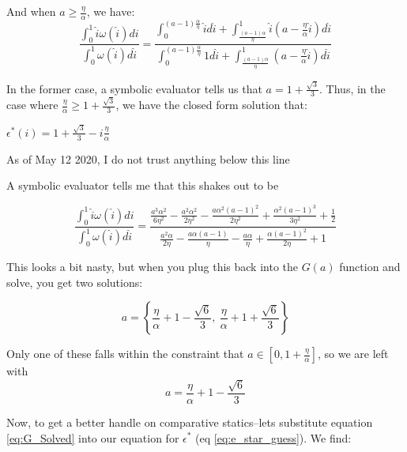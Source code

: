 \documentclass[WP]{AEA}
\begin{document}
And when $a \geq \frac{\eta}{\alpha}$, we have:
\begin{equation}\label{eq:E_solved_big_a}
\frac{\int_0^1 \hat{i} \omega(\hat{i}) di}{\int_0^1  \omega(\hat{i}) d\hat{i}} 
=  \frac{\int_0^{(a-1)\frac{\alpha}{\eta}}  \hat{i} d\hat{i} + 
	\int_{\frac{(a-1)\alpha}{\eta}}^1  \hat{i} (a - \frac{\eta}{\alpha}\hat{i}) d\hat{i} }{\int_0^{(a-1)\frac{\alpha}{\eta}} 1 d\hat{i} + 
	\int_{\frac{(a-1)\alpha}{\eta}}^1  (a - \frac{\eta}{\alpha}\hat{i}) d\hat{i} } 
\end{equation}


In the former case, a symbolic evaluator tells us that $a = 1+\frac{\sqrt{3}}{3}$.  Thus, in the case where $ \frac{\eta}{\alpha} \geq 1+\frac{\sqrt{3}}{3}$, we have the closed form solution that:

$\epsilon^*(i) = 1+\frac{\sqrt{3}}{3} - i \frac{\eta}{\alpha}$


As of May 12 2020, I do not trust anything below this line

A symbolic evaluator tells me that this shakes out to be

\begin{equation}
 \frac{\int_0^1 \hat{i} \omega(\hat{i}) di}{\int_0^1  \omega(\hat{i}) d\hat{i}} = \frac{\frac{a^{3} \alpha^{2}}{6 \eta^{2}} - \frac{a^{2} \alpha^{2}}{2 \eta^{2}} - \frac{a \alpha^{2} \left(a - 1\right)^{2}}{2 \eta^{2}} + \frac{\alpha^{2} \left(a - 1\right)^{3}}{3 \eta^{2}} + \frac{1}{2}}{\frac{a^{2} \alpha}{2 \eta} - \frac{a \alpha \left(a - 1\right)}{\eta} - \frac{a \alpha}{\eta} + \frac{\alpha \left(a - 1\right)^{2}}{2 \eta} + 1}
\end{equation}

This looks a bit nasty, but when you plug this back into the $G(a)$ function and solve, you get two solutions:

\begin{equation*}
a = \left\{ \frac{\eta}{\alpha} +1 - \frac{\sqrt{6}}{3} , \   \frac{\eta}{\alpha} + 1 + \frac{\sqrt{6}}{3} \right\}
\end{equation*}

Only one of these falls within the constraint that  $a \in [0,1+\frac{\eta }{\alpha}]$, so we are left with 
\begin{equation} \label{eq:G_Solved}
a =  \frac{\eta}{\alpha} +1 - \frac{\sqrt{6}}{3} 
\end{equation}

Now, to get a better handle on comparative statics--lets substitute equation \ref{eq:G_Solved} into our equation for $\epsilon^*$ (eq \ref{eq:e_star_guess}).  We find:
\end{document}
